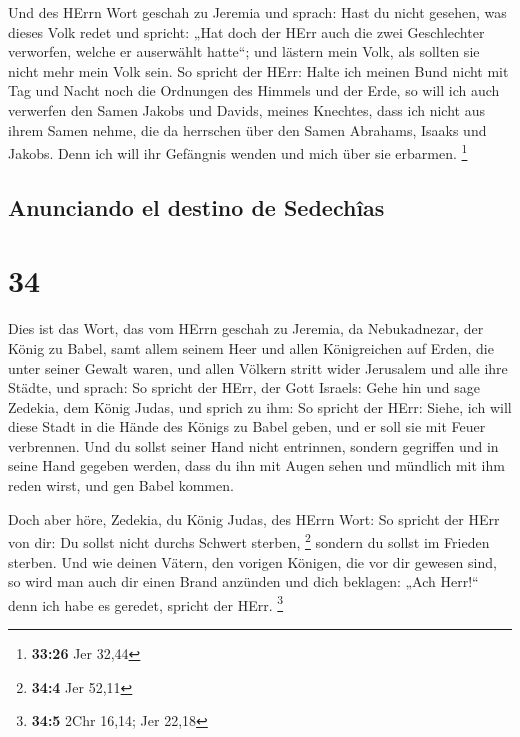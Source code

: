  Und des HErrn Wort geschah zu Jeremia und sprach:
 Hast du nicht gesehen, was dieses Volk redet und
spricht: „Hat doch der HErr auch die zwei Geschlechter verworfen, welche
er auserwählt hatte``; und lästern mein Volk, als sollten sie nicht mehr
mein Volk sein.  So spricht der HErr: Halte ich meinen
Bund nicht mit Tag und Nacht noch die Ordnungen des Himmels und der
Erde,  so will ich auch verwerfen den Samen Jakobs und
Davids, meines Knechtes, dass ich nicht aus ihrem Samen nehme, die da
herrschen über den Samen Abrahams, Isaaks und Jakobs. Denn ich will ihr
Gefängnis wenden und mich über sie erbarmen. \footnote{\textbf{33:26}
  Jer 32,44}

\hypertarget{anunciando-el-destino-de-sedechuxeeas}{%
\subsection{Anunciando el destino de
Sedechîas}\label{anunciando-el-destino-de-sedechuxeeas}}

\hypertarget{section-33}{%
\section{34}\label{section-33}}

 Dies ist das Wort, das vom HErrn geschah zu Jeremia, da
Nebukadnezar, der König zu Babel, samt allem seinem Heer und allen
Königreichen auf Erden, die unter seiner Gewalt waren, und allen Völkern
stritt wider Jerusalem und alle ihre Städte, und sprach: 
So spricht der HErr, der Gott Israels: Gehe hin und sage Zedekia, dem
König Judas, und sprich zu ihm: So spricht der HErr: Siehe, ich will
diese Stadt in die Hände des Königs zu Babel geben, und er soll sie mit
Feuer verbrennen.  Und du sollst seiner Hand nicht
entrinnen, sondern gegriffen und in seine Hand gegeben werden, dass du
ihn mit Augen sehen und mündlich mit ihm reden wirst, und gen Babel
kommen.

 Doch aber höre, Zedekia, du König Judas, des HErrn Wort:
So spricht der HErr von dir: Du sollst nicht durchs Schwert sterben,
\footnote{\textbf{34:4} Jer 52,11}  sondern du sollst im
Frieden sterben. Und wie deinen Vätern, den vorigen Königen, die vor dir
gewesen sind, so wird man auch dir einen Brand anzünden und dich
beklagen: „Ach Herr!{}`` denn ich habe es geredet, spricht der HErr.
\footnote{\textbf{34:5} 2Chr 16,14; Jer 22,18}

